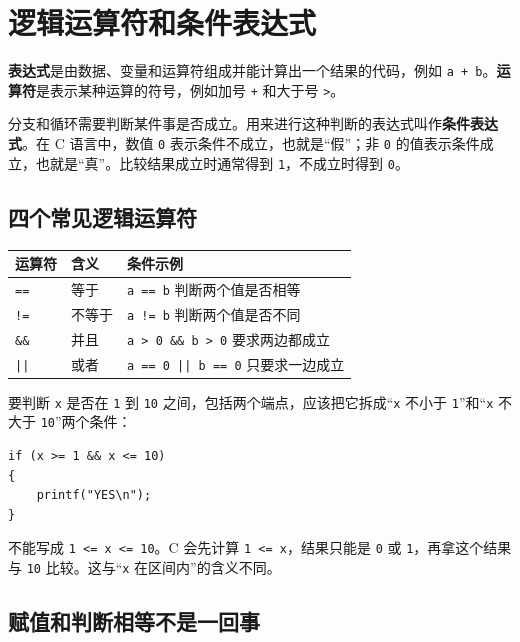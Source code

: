 \documentclass[UTF8,zihao=-4,fontset=windows]{ctexart}
\newcommand{\term}[1]{\textbf{\color{navy}#1}}
\begin{document}
\section{逻辑运算符和条件表达式}

\term{表达式}是由数据、变量和运算符组成并能计算出一个结果的代码，例如 \verb|a + b|。\term{运算符}是表示某种运算的符号，例如加号 \verb|+| 和大于号 \verb|>|。

分支和循环需要判断某件事是否成立。用来进行这种判断的表达式叫作\term{条件表达式}。在 C 语言中，数值 \verb|0| 表示条件不成立，也就是“假”；非 \verb|0| 的值表示条件成立，也就是“真”。比较结果成立时通常得到 \verb|1|，不成立时得到 \verb|0|。

\subsection{四个常见逻辑运算符}

\begin{center}
\begin{tabularx}{0.91\textwidth}{>{\centering\arraybackslash}p{2cm} p{2.8cm} X}
\toprule
运算符 & 含义 & 条件示例 \\
\midrule
\texttt{==} & 等于 & \texttt{a == b} 判断两个值是否相等 \\
\texttt{!=} & 不等于 & \texttt{a != b} 判断两个值是否不同 \\
\texttt{\&\&} & 并且 & \texttt{a > 0 \&\& b > 0} 要求两边都成立 \\
\texttt{||} & 或者 & \texttt{a == 0 || b == 0} 只要求一边成立 \\
\bottomrule
\end{tabularx}
\end{center}

要判断 \verb|x| 是否在 \verb|1| 到 \verb|10| 之间，包括两个端点，应该把它拆成“\verb|x| 不小于 \verb|1|”和“\verb|x| 不大于 \verb|10|”两个条件：

\begin{lstlisting}[style=cstyle]
if (x >= 1 && x <= 10)
{
    printf("YES\n");
}
\end{lstlisting}

不能写成 \verb|1 <= x <= 10|。C 会先计算 \verb|1 <= x|，结果只能是 \verb|0| 或 \verb|1|，再拿这个结果与 \verb|10| 比较。这与“\verb|x| 在区间内”的含义不同。

\subsection{赋值和判断相等不是一回事}
\end{document}
